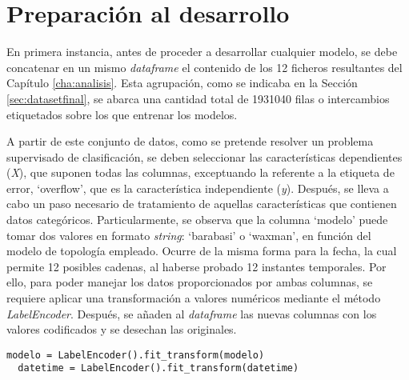 \section{Preparación al desarrollo}
\label{sec:adicional}

En primera instancia, antes de proceder a desarrollar cualquier modelo, se debe concatenar en un mismo \textit{dataframe} el contenido de los 12 ficheros resultantes del Capítulo \ref{cha:analisis}. Esta agrupación, como se indicaba en la Sección \ref{sec:datasetfinal}, se abarca una cantidad total de 1931040 filas o intercambios etiquetados sobre los que entrenar los modelos. 

\vspace{3mm}

A partir de este conjunto de datos, como se pretende resolver un problema supervisado de clasificación, se deben seleccionar las características dependientes (\textit{X}), que suponen todas las columnas, exceptuando la referente a la etiqueta de error, `overflow', que es la característica independiente (\textit{y}). Después, se lleva a cabo un paso necesario de tratamiento de aquellas características que contienen datos categóricos. Particularmente, se observa que la columna `modelo' puede tomar dos valores en formato \textit{string}: `barabasi' o `waxman', en función del modelo de topología empleado. Ocurre de la misma forma para la fecha, la cual permite 12 posibles cadenas, al haberse probado 12 instantes temporales. Por ello, para poder manejar los datos proporcionados por ambas columnas, se requiere aplicar una transformación a valores numéricos mediante el método \textit{LabelEncoder}. Después, se añaden al \textit{dataframe} las nuevas columnas con los valores codificados y se desechan las originales.

\vspace{3mm}

\begin{lstlisting}[style=Python, caption={Codificación de los datos categóricos}]
  modelo = LabelEncoder().fit_transform(modelo) 
  datetime = LabelEncoder().fit_transform(datetime) 
\end{lstlisting}

\vspace{3mm}

